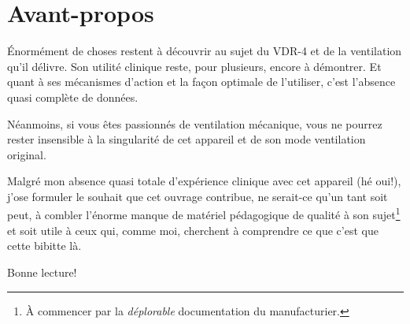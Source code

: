 \chapter{Avant-propos}
Énormément de choses restent à découvrir au sujet du VDR-4 et de la ventilation
qu'il délivre. Son utilité clinique reste, pour plusieurs, encore à démontrer.
Et quant à ses mécanismes d'action et la façon optimale de l'utiliser, c'est
l'absence quasi complète de données.

Néanmoins, si vous êtes passionnés de ventilation mécanique, vous ne pourrez
rester insensible à la singularité de cet appareil et de son mode ventilation
original.

Malgré mon absence quasi totale d'expérience clinique avec cet appareil (hé oui!),
j'ose formuler le souhait que cet ouvrage contribue, ne serait-ce qu'un tant soit peut, à combler l'énorme
manque de matériel pédagogique de qualité à son sujet\footnote{À commencer par la {\em déplorable} documentation du manufacturier.} et soit utile à ceux qui, comme moi,
cherchent à comprendre ce que c'est que cette bibitte là.

Bonne lecture!

\cleardoublepage
\tableofcontents

